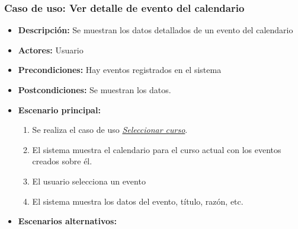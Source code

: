 \documentclass{book}
\begin{document}

\subsubsection*{Caso de uso: Ver detalle de evento del calendario}
\begin{itemize}
\item{\bf Descripción:} Se muestran los datos detallados de un evento del calendario
\item{\bf Actores:} Usuario
\item{\bf Precondiciones:} Hay eventos registrados en el sistema
\item{\bf Postcondiciones:} Se muestran los datos.
\item{\bf Escenario principal:}
	\begin{enumerate}
	\item Se realiza el caso de uso {\em \hyperref[select_curso]{Seleccionar curso}}.
	\item El sistema muestra el calendario para el curso actual con los eventos creados sobre él.
	\item El usuario selecciona un evento
	\item El sistema muestra los datos del evento, título, razón, etc.
	\end{enumerate}
\item{\bf Escenarios alternativos:}
\end{itemize}
\end{document}

